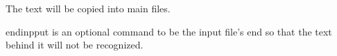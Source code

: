 The text will be copied into main files. 

\noindent endinpput is an optional command to be the input file's end so that 
the text behind it will not be recognized. 
\endinput

These text will not be copied, they are just like comment. 